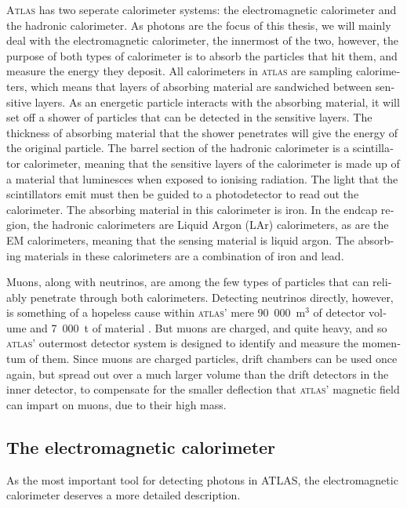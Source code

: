 \begin{english}
\textsc{Atlas} has two seperate calorimeter systems: the electromagnetic calorimeter and the hadronic calorimeter. As photons are the focus of this thesis, we will mainly deal with the electromagnetic calorimeter, the innermost of the two, however, the purpose of both types of calorimeter is to absorb the particles that hit them, and measure the energy they deposit. All calorimeters in \textsc{atlas} are sampling calorimeters, which means that layers of absorbing material are sandwiched between sensitive layers. As an energetic particle interacts with the absorbing material, it will set off a shower of particles that can be detected in the sensitive layers. The thickness of absorbing material that the shower penetrates will give the energy of the original particle. The barrel section of the hadronic calorimeter is a scintillator calorimeter, meaning that the sensitive layers of the calorimeter is made up of a material that luminesces when exposed to ionising radiation. The light that the scintillators emit must then be guided to a photodetector to read out the calorimeter. The absorbing material in this calorimeter is iron. In the endcap region, the hadronic calorimeters are Liquid Argon (LAr) calorimeters, as are the EM calorimeters, meaning that the sensing material is liquid argon. The absorbing materials in these calorimeters are a combination of iron and lead.

Muons, along with neutrinos, are among the few types of particles that can reliably penetrate through both calorimeters. Detecting neutrinos directly, however, is something of a hopeless cause within \textsc{atlas}' mere 90~000~m$^3$ of detector volume and 7~000~t of material \cite{atlasweb}. But muons are charged, and quite heavy, and so \textsc{atlas}' outermost detector system is designed to identify and measure the momentum of them. Since muons are charged particles, drift chambers can be used once again, but spread out over a much larger volume than the drift detectors in the inner detector, to compensate for the smaller deflection that \textsc{atlas}' magnetic field can impart on muons, due to their high mass.

\subsection{The electromagnetic calorimeter}

As the most important tool for detecting photons in ATLAS, the electromagnetic calorimeter deserves a more detailed description.


\end{english}
